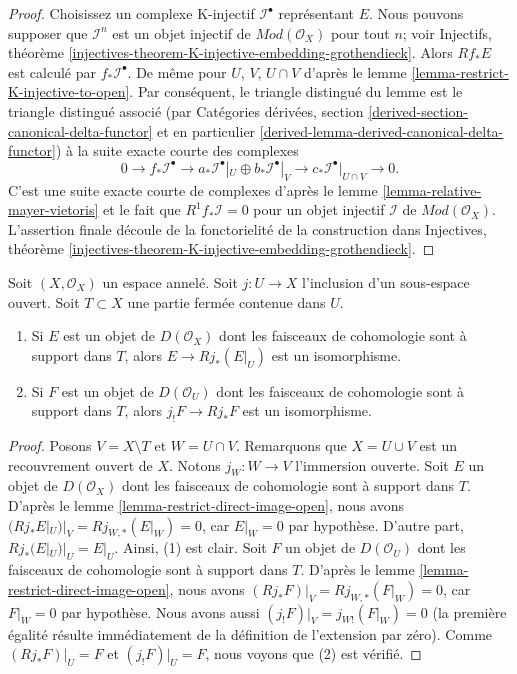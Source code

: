 {\begin{proof}

Choisissez un complexe K-injectif $\mathcal{I}^\bullet$
représentant $E$. Nous pouvons supposer que $\mathcal{I}^n$ est un objet injectif de $\textit{Mod}(\mathcal{O}_X)$ pour tout $n$; voir Injectifs, théorème
\ref{injectives-theorem-K-injective-embedding-grothendieck}. Alors $Rf_*E$ est calculé par $f_*\mathcal{I}^\bullet$. De même pour $U$, $V$, $U \cap V$ d'après le lemme \ref{lemma-restrict-K-injective-to-open}. Par conséquent, le triangle distingué du lemme est le triangle distingué associé (par Catégories dérivées, section
\ref{derived-section-canonical-delta-functor} et en particulier \ref{derived-lemma-derived-canonical-delta-functor}) à la suite exacte courte des complexes
$$
0 \to
f_*\mathcal{I}^\bullet \to
a_*\mathcal{I}^\bullet|_U \oplus b_*\mathcal{I}^\bullet|_V \to
c_*\mathcal{I}^\bullet|_{U \cap V} \to
0.
$$
C'est une suite exacte courte de complexes d'après le lemme \ref{lemma-relative-mayer-vietoris}
et le fait que $R^1f_*\mathcal{I} = 0$
pour un objet injectif $\mathcal{I}$ de $\textit{Mod}(\mathcal{O}_X)$. L'assertion finale découle de la fonctorielité de la construction dans Injectives, théorème
\ref{injectives-theorem-K-injective-embedding-grothendieck}.

\end{proof}

\begin{lemma}

\label{lemma-pushforward-restriction}
Soit $(X, \mathcal{O}_X)$ un espace annelé. Soit $j : U \to X$ l'inclusion d'un sous-espace ouvert. Soit $T \subset X$ une partie fermée contenue dans $U$.
\begin{enumerate}
\item Si $E$ est un objet de $D(\mathcal{O}_X)$ dont les faisceaux de cohomologie sont à support dans $T$, alors $E \to Rj_*(E|_U)$ est un isomorphisme.
\item Si $F$ est un objet de $D(\mathcal{O}_U)$ dont les faisceaux de cohomologie sont à support dans $T$, alors $j_!F \to Rj_*F$ est un isomorphisme.
\end{enumerate}

\end{lemma}

\begin{proof}

Posons $V = X \setminus T$ et $W = U \cap V$. Remarquons que $X = U \cup V$ est un recouvrement ouvert de $X$. Notons $j_W : W \to V$ l'immersion ouverte. Soit $E$ un objet de $D(\mathcal{O}_X)$ dont les faisceaux de cohomologie sont à support dans $T$. D'après le lemme \ref{lemma-restrict-direct-image-open}, nous avons
$(Rj_*E|_U)|_V = Rj_{W, *}(E|_W) = 0$, car $E|_W = 0$ par hypothèse. D'autre part, $Rj_*(E|_U)|_U = E|_U$. Ainsi, (1) est clair. Soit $F$ un objet de $D(\mathcal{O}_U)$ dont les faisceaux de cohomologie sont à support dans $T$. D'après le lemme \ref{lemma-restrict-direct-image-open}, nous avons
$(Rj_*F)|_V = Rj_{W, *}(F|_W) = 0$, car $F|_W = 0$ par hypothèse. Nous avons aussi $(j_!F)|_V = j_{W!}(F|_W) = 0$ (la première égalité résulte immédiatement de la définition de l'extension par zéro).
Comme $(Rj_*F)|_U = F$ et $(j_!F)|_U = F$, nous voyons que (2) est vérifié.


\end{proof}}
